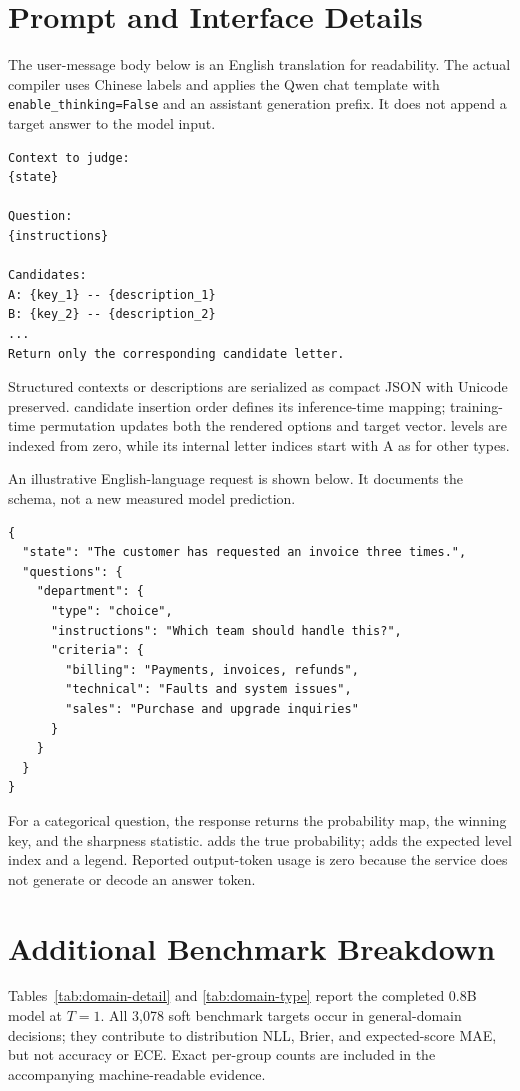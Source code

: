\section{Prompt and Interface Details}
\label{app:prompt}
The user-message body below is an English translation for readability. The actual compiler uses Chinese labels and applies the Qwen chat template with \texttt{enable\_thinking=False} and an assistant generation prefix. It does not append a target answer to the model input.
\begin{lstlisting}
Context to judge:
{state}

Question:
{instructions}

Candidates:
A: {key_1} -- {description_1}
B: {key_2} -- {description_2}
...
Return only the corresponding candidate letter.
\end{lstlisting}
Structured contexts or descriptions are serialized as compact JSON with Unicode preserved. \choice{} candidate insertion order defines its inference-time mapping; training-time permutation updates both the rendered options and target vector. \score{} levels are indexed from zero, while its internal letter indices start with A as for other types.

An illustrative English-language request is shown below. It documents the schema, not a new measured model prediction.
\begin{lstlisting}
{
  "state": "The customer has requested an invoice three times.",
  "questions": {
    "department": {
      "type": "choice",
      "instructions": "Which team should handle this?",
      "criteria": {
        "billing": "Payments, invoices, refunds",
        "technical": "Faults and system issues",
        "sales": "Purchase and upgrade inquiries"
      }
    }
  }
}
\end{lstlisting}
For a categorical question, the response returns the probability map, the winning key, and the sharpness statistic. \noul{} adds the true probability; \score{} adds the expected level index and a legend. Reported output-token usage is zero because the service does not generate or decode an answer token.

\section{Additional Benchmark Breakdown}
\label{app:breakdown}
\suppressfloats[t]


Tables~\ref{tab:domain-detail} and \ref{tab:domain-type} report the completed 0.8B model at $T=1$. All 3,078 soft benchmark targets occur in general-domain \score{} decisions; they contribute to distribution NLL, Brier, and expected-score MAE, but not accuracy or ECE. Exact per-group counts are included in the accompanying machine-readable evidence.

